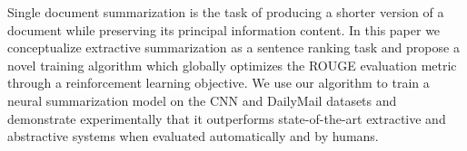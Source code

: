 Single document summarization is the task of producing a shorter version of a document while preserving its principal information content.  In this paper we conceptualize extractive summarization as a sentence ranking task and propose a novel training algorithm which globally optimizes the ROUGE evaluation metric through a reinforcement learning objective.  We use our algorithm to train a neural summarization model on the CNN and DailyMail datasets and demonstrate experimentally that it outperforms state-of-the-art extractive and abstractive systems when evaluated automatically and by humans.
